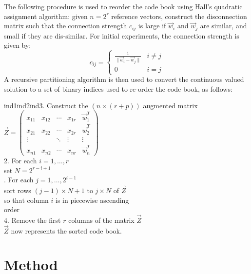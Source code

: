 \documentclass[12pt,a4paper]{report}
\begin{document}
The following procedure is used to reorder the code book using Hall's
quadratic assignment algorithm: given $n=2^r$ reference vectors, construct the
disconnection matrix such that the connection strength $c_{ij}$ is large
if $\vec{w}_i$ and $\vec{w}_j$ are similar, and small if they are
dis-similar.  For initial experiments, the connection strength is given by:
\begin{displaymath}
c_{ij} =
\left\{
\begin{array}{cl}
\frac{1}{\|\vec{w}_i - \vec{w}_j\|} & i \neq j\\
0 & i = j
\end{array}
\right.
\end{displaymath}
A recursive partitioning algorithm is then used to convert the continuous valued
solution to a set of binary indices used to re-order the code book, as follows:

\begin{tabbing}
ind1\= ind2\= ind3\= .  Construct the $(n\times (r+p))$ augmented matrix\\[10pt]
\> \begin{math}
\vec{Z} =
\left(
\begin{array}{ccccc}
x_{11} & x_{12} & \cdots & x_{1r} & \vec{w}_1^T\\
x_{21} & x_{22} & \cdots & x_{2r} & \vec{w}_2^T\\
\vdots & & \ddots & \vdots & \vdots\\
x_{n1} & x_{n2} & \cdots & x_{nr} & \vec{w}_n^T
\end{array}
\right)
\end{math}\\[10pt]
2. For each $i=1,\ldots, r$\\
\> set $N=2^{r-i+1}$\\
. For each $j=1, \ldots, 2^{i-1}$\\
\>\> sort rows $(j-1)\times N+1$ to $j\times N$ of $\vec{Z}$\\
\>\> so that column $i$ is in piecewise ascending\\
\>\> order\\
4. Remove the first $r$ columns of the matrix $\vec{Z}$\\[10pt]
$\vec{Z}$ now represents the sorted code book.
\end{tabbing}

\chapter{Method}
\end{document}
